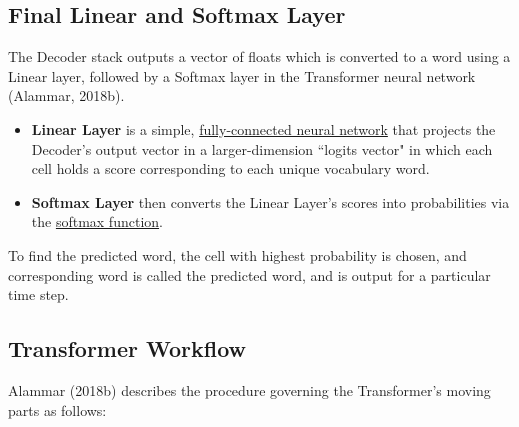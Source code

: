 \subsection{Final Linear and Softmax Layer} \label{sec:TransformerFinalLayer}


The Decoder stack outputs a vector of floats which is converted to a word using a Linear layer, followed by a Softmax layer in the Transformer neural network (Alammar, 2018b). 
\begin{itemize}
    \item \textbf{Linear Layer} is a simple, \hyperref[sec:NeuralLM]{fully-connected neural network} that projects the Decoder's output vector in a larger-dimension ``logits vector" in which each cell holds a score corresponding to each unique vocabulary word. 
    
    \item \textbf{Softmax Layer} then converts the Linear Layer's scores into probabilities via the \hyperref[cnc:softmaxLayer]{softmax function}. 
\end{itemize}

To find the predicted word, the cell with highest probability is chosen, and corresponding word is called the predicted word, and is output for a particular time step.




\subsection{Transformer Workflow} \label{sec:TransformerWorkflow}

Alammar (2018b) describes the procedure governing the Transformer's moving parts as follows: 

